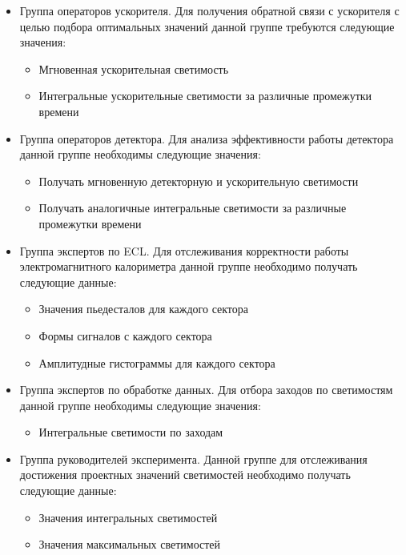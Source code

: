 \begin{itemize}

  \item Группа операторов ускорителя. Для получения обратной связи с ускорителя с целью подбора оптимальных значений данной группе требуются следующие значения:
    \begin{itemize}
      \item Мгновенная ускорительная светимость
      \item Интегральные ускорительные светимости за различные промежутки времени
    \end{itemize}

  \item Группа операторов детектора. Для анализа эффективности работы детектора данной группе необходимы следующие значения:
    \begin{itemize}
      \item Получать мгновенную детекторную и ускорительную светимости
      \item Получать аналогичные интегральные светимости за различные промежутки времени 
    \end{itemize}

  \item Группа экспертов по ECL. Для отслеживания корректности работы электромагнитного калориметра данной группе необходимо получать следующие данные:
    \begin{itemize}
      \item Значения пьедесталов для каждого сектора
      \item Формы сигналов с каждого сектора 
      \item Амплитудные гистограммы для каждого сектора 
    \end{itemize}

  \item Группа экспертов по обработке данных. Для отбора заходов по светимостям данной группе необходимы следующие значения:
    \begin{itemize}
      \item Интегральные светимости по заходам
    \end{itemize}

  \item Группа руководителей эксперимента. Данной группе для отслеживания достижения проектных значений светимостей необходимо получать следующие данные:
    \begin{itemize}
      \item Значения интегральных светимостей
      \item Значения максимальных светимостей
    \end{itemize}

\end{itemize}
